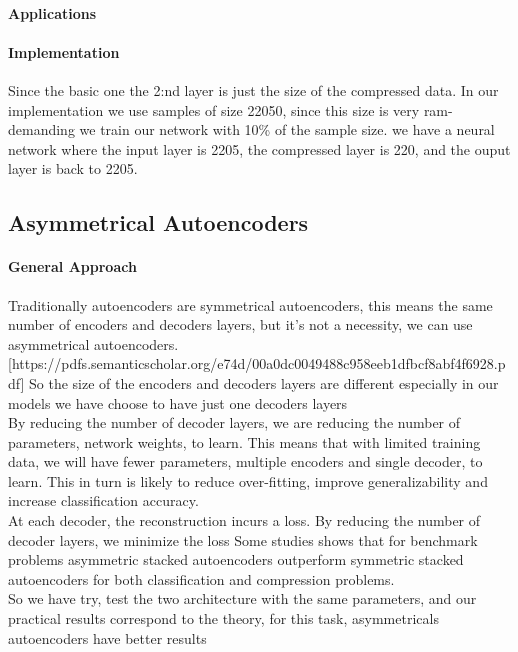 \documentclass[11pt]{article}
\begin{document}
\paragraph{Applications}
\paragraph{Implementation}
Since the basic one
the 2:nd layer is just the size of the compressed data.
In our implementation we use samples of size 22050, since this size is very ram-demanding we train our network with 10\% of the sample size.
we have a neural network where the input layer is 2205, the compressed layer is 220, and the ouput layer is back to 2205.


\subsection{Asymmetrical Autoencoders}

\paragraph{General Approach}

Traditionally autoencoders are symmetrical autoencoders, this means the same number of encoders and decoders layers, but it’s not a necessity, we can use asymmetrical autoencoders.
[https://pdfs.semanticscholar.org/e74d/00a0dc0049488c958eeb1dfbcf8abf4f6928.pdf]
So the size of the encoders and decoders layers are different especially in our models we have choose to have just one decoders layers\\
By reducing the number of decoder layers, we are reducing the number of parameters, network weights, to learn. This means that with limited training data, we will have fewer parameters, multiple encoders and single decoder, to learn. This in turn is likely to reduce over-fitting, improve generalizability and increase classification accuracy. \\
At each decoder, the reconstruction incurs a loss. By reducing the number of decoder layers, we minimize the loss
Some studies shows that for benchmark problems asymmetric stacked autoencoders outperform symmetric stacked autoencoders for both classification and compression problems. \\
So we have try, test the two architecture with the same parameters, and our practical results correspond to the theory, for this task, asymmetricals autoencoders have better results
  
\end{document}
